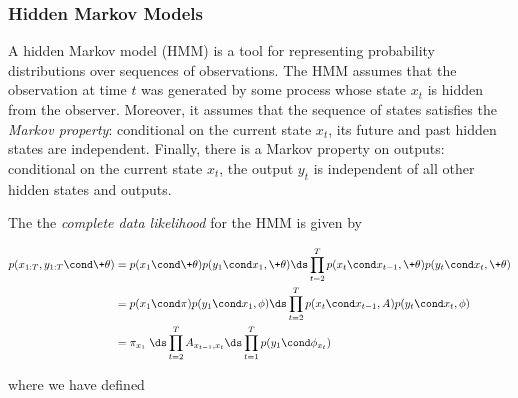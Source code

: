 \documentclass{article} %
\newcommand{\param}{\+\theta}
\newcommand{\state}{x}
\begin{document}
\subsubsection{Hidden Markov Models} 

\begin{example}
A  hidden Markov model (HMM) is a tool for representing probability distributions over sequences of observations.  The HMM assumes that the observation at time $t$ was generated by some process whose state $\state_t$ is hidden from the observer.  Moreover, it assumes that the sequence of states satisfies the \textit{Markov property}:  conditional on the current state $\state_t$, its future and past hidden states are independent.  Finally, there is a Markov property on outputs:  conditional on the current state $\state_t$, the output $y_t$ is independent of all other hidden states and outputs.

%
%
 
The the \textit{complete data likelihood} for the HMM is given by

\begin{align}
 p(\state_{1:T}, y_{1:T} \cond \param) &=  p(\state_1 \cond \param)  p(y_1 \cond \state_1, \param) \ds\prod_{t=2}^T p(\state_t \cond \state_{t-1}, \param) p(y_t \cond \state_t, \param) \nonumber \\
 &=  p(\state_1 \cond \pi) p(y_1 \cond \state_1, \phi) \ds\prod_{t=2}^T p(\state_t \cond \state_{t-1}, A) p(y_t \cond \state_t, \phi)   \nonumber \\
 &= \pi_{\state_1}  \; \ds\prod_{t=2}^T A_{\state_{t-1}, \state_t} \ds\prod_{t=1}^T p(y_1 \cond \phi_{\state_t}) \label{eqn:hmm_cdl_compact}
 \end{align}
 
where we have defined 


\end{example}
\end{document}
